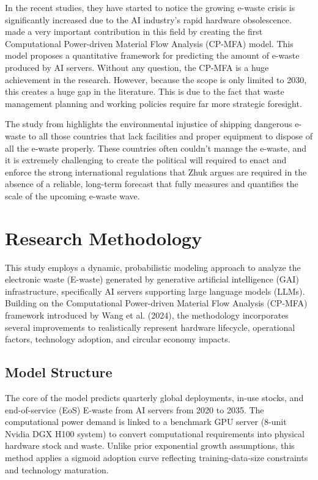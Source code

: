 \documentclass[a4paper, 12pt]{article}
\begin{document}
 In the recent studies, they have started to notice the growing e-waste crisis is significantly increased due to the AI industry's rapid hardware obsolescence. \citet{wang_2024_ewaste} made a very important contribution in this field by creating the first Computational Power-driven Material Flow Analysis (CP-MFA) model. This model proposes a quantitative framework for predicting the amount of e-waste produced by AI servers. Without any question, the CP-MFA is a huge achievement in the research. However, because the scope is only limited to 2030, this creates a huge gap in the literature. This is due to the fact that waste management planning and working policies require far more strategic foresight. 

The study from \citet{Zhuk2023} highlights the environmental injustice of shipping dangerous e-waste to all those countries that lack facilities and proper equipment to dispose of all the e-waste properly. These countries often couldn't manage the e-waste, and it is extremely challenging to create the political will required to enact and enforce the strong international regulations that Zhuk argues are required in the absence of a reliable, long-term forecast that fully measures and quantifies the scale of the upcoming e-waste wave.

\section{Research Methodology}
This study employs a dynamic, probabilistic modeling approach to analyze the electronic waste (E-waste) generated by generative artificial intelligence (GAI) infrastructure, specifically AI servers supporting large language models (LLMs). Building on the Computational Power-driven Material Flow Analysis (CP-MFA) framework introduced by Wang et al. (2024), the methodology incorporates several improvements to realistically represent hardware lifecycle, operational factors, technology adoption, and circular economy impacts.

\subsection{Model Structure}
The core of the model predicts quarterly global deployments, in-use stocks, and end-of-service (EoS) E-waste from AI servers from 2020 to 2035. The computational power demand is linked to a benchmark GPU server (8-unit Nvidia DGX H100 system) to convert computational requirements into physical hardware stock and waste. Unlike prior exponential growth assumptions, this method applies a sigmoid adoption curve reflecting training-data-size constraints and technology maturation.
\end{document}
